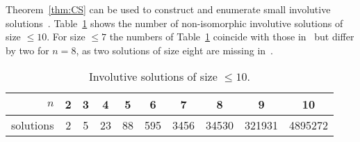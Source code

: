 Theorem~\ref{thm:CS} can be used to construct and enumerate small 
involutive solutions~\cite{AMV}. Table~\ref{tab:IYB} shows the 
number of non-isomorphic involutive solutions of size $\leq10$. 
For size $\leq7$ the numbers of Table~\ref{tab:IYB} coincide with those in~\cite{MR1722951}
but differ by two for $n=8$, as two solutions of size eight 
are missing in~\cite{MR1722951}. 

\begin{table}[H]
	\centering
	\caption{Involutive solutions of size $\leq10$.}
	\begin{tabular}{|r|ccccccccc|}
		\hline
		$n$ & 2 & 3 & 4 & 5 & 6 & 7 & 8 & 9 & 10\tabularnewline
		\hline 
		solutions & 2 & 5 & 23 & 88 & 595 & 3456 & 34530 & 321931 & 4895272\tabularnewline
		\hline
	\end{tabular}
	\label{tab:IYB}
\end{table}





